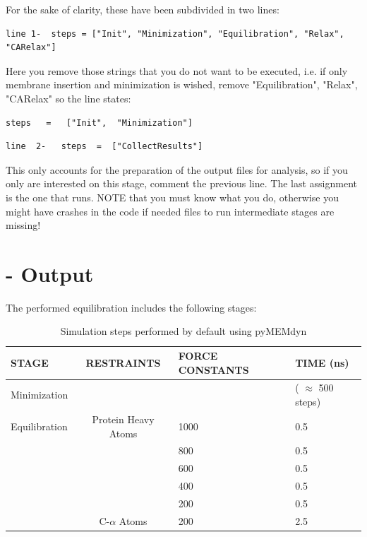 \documentclass[10pt, oneside, pdftex]{article}
\begin{document}
For the  sake of clarity,  these have been  subdivided in  two lines:  

\begin{Verbatim}
line 1-  steps = ["Init", "Minimization", "Equilibration", "Relax", "CARelax"] 
\end{Verbatim}
Here you remove those strings that you do not want to be executed, i.e. if only
membrane insertion and minimization is wished, remove "Equilibration",
"Relax",   "CARelax"   so   the   line  states:   
\begin{Verbatim}
steps   =   ["Init",  "Minimization"]  
\end{Verbatim}

\begin{Verbatim}
line  2-   steps  =  ["CollectResults"]  
\end{Verbatim}

This  only accounts for the  preparation of the output files  for analysis, so if
you only are interested on  this stage, comment the previous line. The
last assignment  is the one that  runs.  NOTE that you  must know what
you do, otherwise  you might have crashes in the  code if needed files
to  run  intermediate  stages   are  missing!   

\section*{ - Output}  
The  performed equilibration includes the following stages:

\begin{table}[htbp]
\centering
\small\addtolength{\tabcolsep}{-2pt}
\begin{tabular}{p{1.8cm}|c|p{1.9cm}|p{2.0cm}}
\hline
\textbf{STAGE} & \textbf{RESTRAINTS} & \textbf{FORCE CONSTANTS} & \textbf{TIME} (ns)  \\ \hline
Minimization   &                   &                 & ( $\approx$ 500 steps)\\ \hline
Equilibration  & Protein Heavy Atoms & 1000          & 0.5\\
               &  & 800      & 0.5\\
               &  & 600      & 0.5\\
               &  & 400      & 0.5\\
               &  & 200      & 0.5\\
               & C-$\alpha$ Atoms & 200      & 2.5\\ \hline
\end{tabular}
\parbox{5.8in}{\caption{\footnotesize{Simulation steps performed by default using pyMEMdyn}}}
\label{tab:equilibration}
\end{table}
\end{document}

